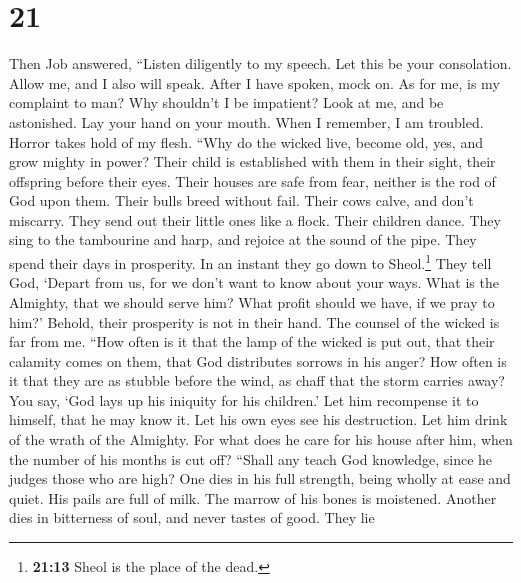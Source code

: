 \hypertarget{section-15}{%
\section{21}\label{section-15}}

 Then Job answered,  ``Listen diligently to
my speech. Let this be your consolation.  Allow me, and I
also will speak. After I have spoken, mock on.  As for me,
is my complaint to man? Why shouldn't I be impatient? 
Look at me, and be astonished. Lay your hand on your mouth.
 When I remember, I am troubled. Horror takes hold of my
flesh.  ``Why do the wicked live, become old, yes, and
grow mighty in power?  Their child is established with
them in their sight, their offspring before their eyes. 
Their houses are safe from fear, neither is the rod of God upon them.
 Their bulls breed without fail. Their cows calve, and
don't miscarry.  They send out their little ones like a
flock. Their children dance.  They sing to the tambourine
and harp, and rejoice at the sound of the pipe.  They
spend their days in prosperity. In an instant they go down to
Sheol.\footnote{\textbf{21:13} Sheol is the place of the dead.}
 They tell God, `Depart from us, for we don't want to
know about your ways.  What is the Almighty, that we
should serve him? What profit should we have, if we pray to him?'
 Behold, their prosperity is not in their hand. The
counsel of the wicked is far from me.  ``How often is it
that the lamp of the wicked is put out, that their calamity comes on
them, that God distributes sorrows in his anger?  How
often is it that they are as stubble before the wind, as chaff that the
storm carries away?  You say, `God lays up his iniquity
for his children.' Let him recompense it to himself, that he may know
it.  Let his own eyes see his destruction. Let him drink
of the wrath of the Almighty.  For what does he care for
his house after him, when the number of his months is cut off?
 ``Shall any teach God knowledge, since he judges those
who are high?  One dies in his full strength, being
wholly at ease and quiet.  His pails are full of milk.
The marrow of his bones is moistened.  Another dies in
bitterness of soul, and never tastes of good.  They lie
